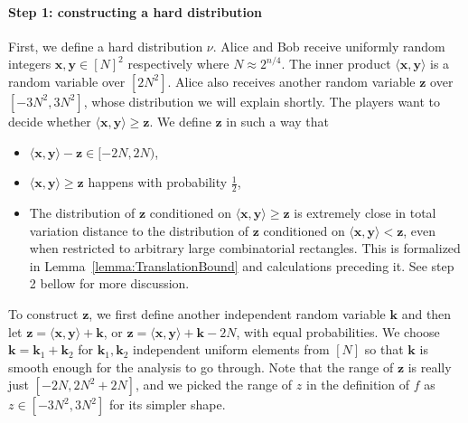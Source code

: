 \documentclass{toc}
\newcommand{\x}{\mathbf{x}}
\newcommand{\y}{\mathbf{y}}
\newcommand{\z}{\mathbf{z}}
\newcommand{\Bk}{\mathbf{k}}   %
\begin{document}
\paragraph{Step 1: constructing a hard distribution}
First, we define a hard distribution $\nu$. Alice and Bob receive uniformly random integers $\x,\y\in [N]^2$ respectively where $N \approx 2^{n/4}$. The inner product $\langle \x,\y\rangle$ is a random variable over $[2N^2]$. Alice also receives another random variable $\z$ over $[-3N^2,3N^2]$, whose distribution we will explain shortly. The players want to decide whether $\langle \x,\y\rangle \ge \z$. We define $\z$ in such a way that
\begin{itemize}
	\item  $\langle \x,\y\rangle -\z  \in [-2N,2N)$,

	\item $\langle \x,\y\rangle \ge \z$  happens with probability $\frac{1}{2}$,
	\item The distribution of $ \z $ conditioned on $\langle \x,\y\rangle \ge \z$ is extremely close in total variation distance to the distribution of $\z$ conditioned on $\langle \x,\y\rangle < \z$, even when restricted to arbitrary large combinatorial rectangles. This is formalized in Lemma~\ref{lemma:TranslationBound} and calculations preceding it. See step 2 bellow for more discussion. 
\end{itemize}
To construct $\z$, we first define another independent random variable $\Bk$ and then let $\z = \langle \x,\y\rangle + \Bk$, or $\z =\langle \x,\y\rangle + \Bk-2N$, with equal probabilities. We choose $\Bk = \Bk_1+\Bk_2 $ for $\Bk_1,\Bk_2$ independent uniform elements from $[N]$ so that $\Bk$ is smooth enough
for the analysis to go through.
Note that the range of $\z$ is really just $[-2N,2N^2+2N]$, and we picked the range of $z$ in the definition of $f$ as $z\in [-3N^2,3N^2]$ for its simpler shape.
\end{document}
